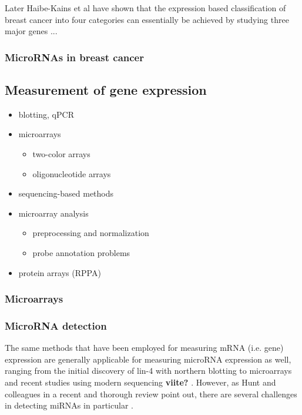 Later Haibe-Kains et al have shown that the expression based classification of
breast cancer into four categories can essentially be achieved by studying
three major genes \citep{T16} ...



\subsubsection{MicroRNAs in breast cancer}








\subsection{Measurement of gene expression}\label{measurement-of-gene-expression}

\begin{itemize}
  \item blotting, qPCR
  \item microarrays
  \begin{itemize}
    \item two-color arrays
    \item oligonucleotide arrays
  \end{itemize}
  \item sequencing-based methods
  \item microarray analysis
  \begin{itemize}
    \item preprocessing and normalization
    \item probe annotation problems
  \end{itemize}
  \item protein arrays (RPPA)
\end{itemize}


\subsubsection{Microarrays}


\subsubsection{MicroRNA detection}

The same methods that have been employed for measuring mRNA (i.e. gene)
expression are generally applicable for measuring microRNA expression as well,
ranging from the initial discovery of lin-4 with northern blotting
\citep{Lee1993} to microarrays \citep{Liu2008} and recent studies using modern sequencing
\textbf{viite?} \citep{esimerkki}. However, as Hunt and colleagues in
a recent and thorough review point out, there are several
challenges in detecting miRNAs in particular \citep{Hunt2015}.

